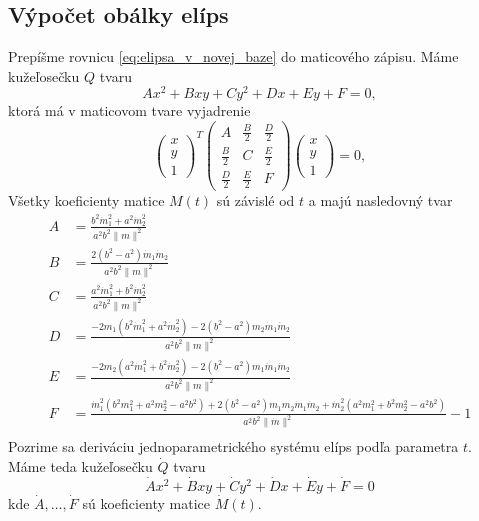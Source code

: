 \subsection{Výpočet obálky elíps}
Prepíšme rovnicu \ref{eq:elipsa_v_novej_baze} do maticového zápisu. Máme kužeľosečku $Q$ tvaru $$
Ax^2 + Bxy + Cy^2 + Dx + Ey + F = 0,$$
ktorá má v maticovom tvare vyjadrenie 
$$
\left(\begin{matrix} x \\ y \\ 1 
\end{matrix} \right)^T \left(\begin{matrix} 
A & \frac{B}{2} & \frac{D}{2} \\
\frac{B}{2} & C & \frac{E}{2} \\
\frac{D}{2} & \frac{E}{2} & F 
\end{matrix} \right)\left(\begin{matrix} x \\ y \\ 1 
\end{matrix} \right) = 0,
$$
Všetky koeficienty matice $M(t)$ sú závislé od $t$ a majú nasledovný tvar
\begin{align*}
A &= \frac{b^2 \dot{m}_1^2 + a^2 \dot{m}_2^2}{a^2b^2 \| m \|^2} \\
B &= \frac{2(b^2-a^2)\dot{m}_1 \dot{m}_2}{a^2b^2 \| m \|^2} \\
C &= \frac{a^2 \dot{m}_1^2 + b^2 \dot{m}_2^2}{a^2b^2\| m\|^2} \\
D &= \frac{- 2m_1 \left( b^2 \dot{m}_1^2 + a^2 \dot{m}_2^2 \right) - 2 \left(b^2 - a^2 \right) m_2 \dot{m}_1 \dot{m}_2 }{a^2b^2\| m \|^2} \\
E &= \frac{- 2m_2 \left( a^2 \dot{m}_1^2 + b^2 \dot{m}_2^2 \right) - 2 \left(b^2 - a^2 \right) m_1 \dot{m}_1 \dot{m}_2 }{a^2b^2\| m \|^2} \\
F &= \frac{\dot{m}_1^2 (b^2 m_1^2 + a^2 m_2^2 - a^2b^2) + 2 (b^2 - a^2) m_1 m_2 \dot{m}_1 \dot{m}_2 + \dot{m}_2^2 (a^2 m_1^2 + b^2 m_2^2 - a^2b^2) }{a^2b^2\| \dot{m}  \|^2}  -  1  \\
\end{align*}
Pozrime sa deriváciu jednoparametrického systému elíps podľa parametra $t.$ Máme teda kužeľosečku $\dot{Q}$ tvaru 
$$
\dot{A}x^2 + \dot{B}xy + \dot{C}y^2 + \dot{D}x + \dot{E}y + \dot{F} = 0$$
kde $\dot{A}, \dots, \dot{F}$ sú koeficienty matice $\dot{M}(t).$

